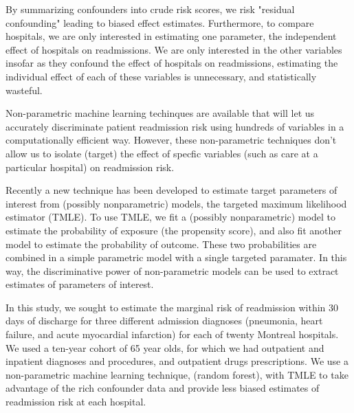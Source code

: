 \documentclass[]{article}\usepackage[]{graphicx}\usepackage[]{color}
\begin{document}
By summarizing confounders into crude risk scores, we risk "residual confounding" leading to biased effect estimates. Furthermore, to compare hospitals, we are only interested in estimating one parameter, the independent effect of hospitals on readmissions. We are only interested in the other variables insofar as they confound the effect of hospitals on readmissions, estimating the individual effect of each of these variables is unnecessary, and statistically wasteful.

Non-parametric machine learning techinques are available that will let us accurately discriminate patient readmission risk using hundreds of variables in a computationally efficient way. However, these non-parametric techniques don't allow us to isolate (target) the effect of specfic variables (such as care at a particular hospital) on readmission risk. 


Recently a new technique has been developed to estimate target parameters of interest from (possibly nonparametric)  models, the targeted maximum likelihood estimator (TMLE). To use TMLE, we fit a (possibly nonparametric) model to estimate the probability of exposure (the propensity score), and also fit another model to estimate the probability of outcome. These two probabilities are combined in a simple parametric model with a single targeted paramater. In this way, the discriminative power of non-parametric models can be used to extract estimates of parameters of interest. 

In this study, we sought to estimate the marginal risk of readmission within 30 days of discharge for three different admission diagnoses (pneumonia, heart failure, and acute myocardial infarction) for each of twenty Montreal hospitals. We used a ten-year cohort of 65 year olds, for which we had outpatient and inpatient diagnoses  and procedures, and outpatient drugs prescriptions. We use a non-parametric machine learning technique, (random forest), with TMLE to take advantage of the rich confounder data and provide less biased estimates of readmission risk at each hospital. 

\end{document}
